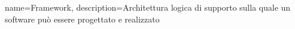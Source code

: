 {
	name={Framework},
	description={Architettura logica di supporto sulla quale un software può essere progettato e realizzato}
}